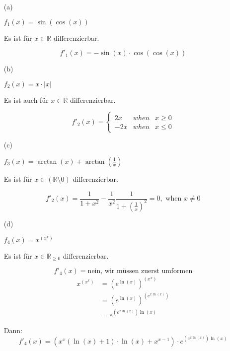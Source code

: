 \begin{enumerate}

\item[(a)]

$f_1(x)=\sin(\cos(x))$

Es ist für $x\in\mathbb{R}$ differenzierbar.

\begin{equation*}
f'_1(x)=-\sin(x)\cdot\cos(\cos(x))
\end{equation*}

\item[(b)]

$f_2(x)=x\cdot|x|$

Es ist auch für $x\in\mathbb{R}$ differenzierbar.

\begin{equation*}
f'_2(x)=
\left\{
\begin{array}{rcl}
2x & when & x\geq 0\\
-2x & when & x\leq 0
\end{array}
\right.
\end{equation*}

\item[(c)]

$f_3(x)=\arctan(x)+\arctan(\frac{1}{x})$

Es ist für $x\in(\mathbb{R}\setminus{0})$ differenzierbar.

\begin{equation*}
f'_2(x)=\frac{1}{1+x^2}-\frac{1}{x^2}\frac{1}{1+(\frac{1}{x})^2}=0,\mbox{ when }x\neq0
\end{equation*}

\item[(d)]

$f_4(x)=x^{(x^x)}$

Es ist für $x\in\mathbb{R}_{\geq0}$ differenzierbar.

\begin{equation*}
f'_4(x)=\mbox{nein, wir müssen zuerst umformen}
\end{equation*}
\begin{align*}
x^{(x^x)}&=(e^{\ln(x)})^{(x^x)}\\
&=(e^{\ln(x)})^{(e^{x\ln(x)})}\\
&=e^{(e^{x\ln(x)})\ln(x)}
\end{align*}

Dann:
\begin{equation*}
f'_4(x)=(x^x(\ln(x)+1)\cdot\ln(x)+x^{x-1})\cdot e^{(e^{x\ln(x)})\ln(x)}
\end{equation*}

\end{enumerate}

